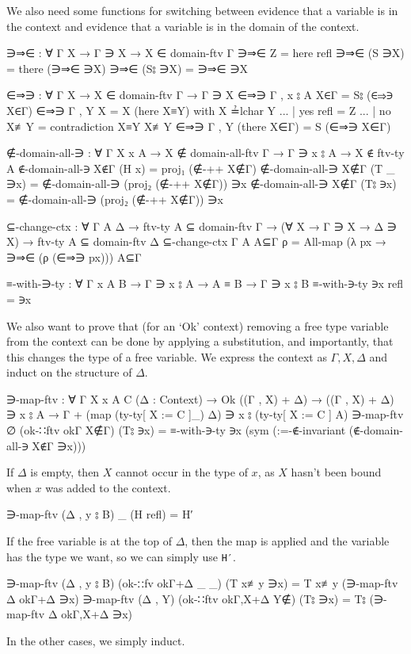 \documentclass[logo,bsc,singlespacing,parskip,online]{infthesis}
\begin{document}
We also need some functions for switching between evidence that a variable is in the context and
evidence that a variable is in the domain of the context.
\begin{code}
  ∋⇒∈ : ∀ {Γ X} → Γ ∋ X → X ∈ domain-ftv Γ
  ∋⇒∈ Z = here refl
  ∋⇒∈ (S ∋X) = there (∋⇒∈ ∋X)
  ∋⇒∈ (S⦂ ∋X) = ∋⇒∈ ∋X

  ∈⇒∋ : ∀ {Γ X} → X ∈ domain-ftv Γ → Γ ∋ X
  ∈⇒∋ {Γ , x ⦂ A} X∈Γ = S⦂ (∈⇒∋ X∈Γ)
  ∈⇒∋ {Γ , Y} {X = X} (here X≡Y) with X ≟lchar Y
  ... | yes refl = Z
  ... | no  X≢Y  = contradiction X≡Y X≢Y
  ∈⇒∋ {Γ , Y} (there X∈Γ) = S (∈⇒∋ X∈Γ)

  ∉-domain-all-∋ : ∀ {Γ X x A} → X ∉ domain-all-ftv Γ → Γ ∋ x ⦂ A
    → X ∉ ftv-ty A
  ∉-domain-all-∋ X∉Γ (H x) = proj₁ (∉-++ X∉Γ)
  ∉-domain-all-∋ X∉Γ (T _ ∋x) =
    ∉-domain-all-∋ (proj₂ (∉-++ X∉Γ)) ∋x
  ∉-domain-all-∋ X∉Γ (T⦂ ∋x) =
    ∉-domain-all-∋ (proj₂ (∉-++ X∉Γ)) ∋x

  ⊆-change-ctx : ∀ {Γ A Δ} → ftv-ty A ⊆ domain-ftv Γ
    → (∀ {X} → Γ ∋ X → Δ ∋ X)
    → ftv-ty A ⊆ domain-ftv Δ
  ⊆-change-ctx {Γ} {A} A⊆Γ ρ =
    All-map (λ px → ∋⇒∈ (ρ (∈⇒∋ px))) A⊆Γ

  ≡-with-∋-ty : ∀ {Γ x A B} → Γ ∋ x ⦂ A → A ≡ B → Γ ∋ x ⦂ B
  ≡-with-∋-ty ∋x refl = ∋x
\end{code}

We also want to prove that (for an `Ok' context) removing a free type variable from the context can
be done by applying a substitution, and importantly, that this changes the type of a free variable.
We express the context as $\Gamma, X, \Delta$ and induct on the structure of $\Delta$.
\begin{code}
  ∋-map-ftv : ∀ {Γ X x A C} (Δ : Context)
    → Ok ((Γ , X) + Δ)
    → ((Γ , X) + Δ) ∋ x ⦂ A
    → Γ + (map (ty-ty[ X := C ]_) Δ) ∋ x ⦂ (ty-ty[ X := C ] A)
  ∋-map-ftv ∅ (ok-∷ftv okΓ X∉Γ) (T⦂ ∋x) = ≡-with-∋-ty
    ∋x
    (sym (:=-∉-invariant (∉-domain-all-∋ X∉Γ ∋x)))
\end{code}
If $\Delta$ is empty, then $X$ cannot occur in the type of $x$, as $X$ hasn't been bound when $x$
was added to the context.
\begin{code}
  ∋-map-ftv (Δ , y ⦂ B) _ (H refl) = H′
\end{code}
If the free variable is at the top of $\Delta$, then the map is applied and the variable has the
type we want, so we can simply use \texttt{H′}.
\begin{code}
  ∋-map-ftv (Δ , y ⦂ B) (ok-∷fv okΓ+Δ _ _) (T x≢y ∋x) =
    T x≢y (∋-map-ftv Δ okΓ+Δ ∋x)
  ∋-map-ftv (Δ , Y) (ok-∷ftv okΓ,X+Δ Y∉) (T⦂ ∋x) =
    T⦂ (∋-map-ftv Δ okΓ,X+Δ ∋x)
\end{code}
In the other cases, we simply induct.
\end{document}
